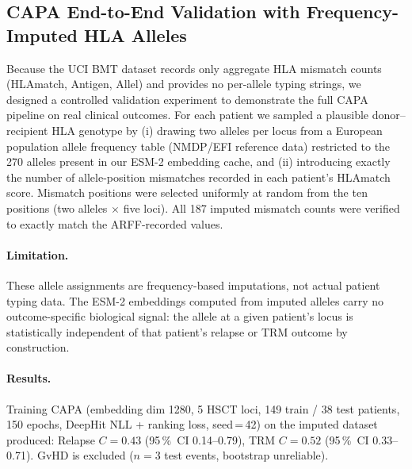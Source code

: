 \documentclass[11pt,a4paper]{article}
\begin{document}
\subsection{CAPA End-to-End Validation with Frequency-Imputed HLA Alleles}
\label{sec:capa_imputed}

Because the UCI BMT dataset records only aggregate HLA mismatch counts
(HLAmatch, Antigen, Allel) and provides no per-allele typing strings, we
designed a controlled validation experiment to demonstrate the full CAPA
pipeline on real clinical outcomes.  For each patient we sampled a plausible
donor--recipient HLA genotype by (i) drawing two alleles per locus from a
European population allele frequency table (NMDP/EFI reference data) restricted
to the 270 alleles present in our ESM-2 embedding cache, and (ii) introducing
exactly the number of allele-position mismatches recorded in each patient's
HLAmatch score.  Mismatch positions were selected uniformly at random from the
ten positions (two alleles $\times$ five loci).  All 187 imputed mismatch
counts were verified to exactly match the ARFF-recorded values.

\paragraph{Limitation.}
These allele assignments are frequency-based imputations, not actual patient
typing data.  The ESM-2 embeddings computed from imputed alleles carry no
outcome-specific biological signal: the allele at a given patient's locus is
statistically independent of that patient's relapse or TRM outcome by
construction.

\paragraph{Results.}
Training CAPA (embedding dim 1280, 5 HSCT loci, 149 train / 38 test patients,
150 epochs, DeepHit NLL + ranking loss, seed\,=\,42) on the imputed dataset
produced: Relapse $C = 0.43$ (95\,\%~CI 0.14--0.79), TRM $C = 0.52$
(95\,\%~CI 0.33--0.71).  GvHD is excluded ($n = 3$ test events, bootstrap
unreliable).
\end{document}
